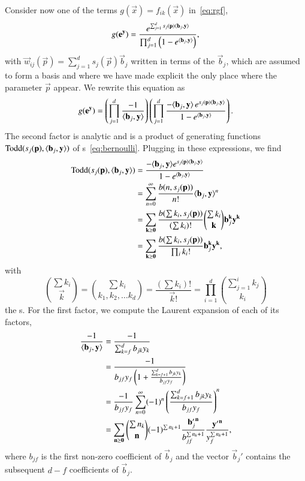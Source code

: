 Consider now one of the terms $g(\vec x) = f_{ik}(\vec x)$ in~\eqref{eq:rgf},
$$
g(\vec e^{\vec y}) =
	\frac{e^{\sum_{j=1}^d s_j(\vec p) \sp{b_j}y}}
	     {\prod_{j=1}^{d}\left(1-e^{\sp{b_j}y}\right)}
,
$$
with $\vec w_{ij}(\vec p) = \sum_{j=1}^d s_j(\vec p) \vec b_j$ written
in terms of the $\vec b_j$, which are assumed to form a basis
and where we have made explicit the only place where the
parameter $\vec p$ appear.
We rewrite this equation as
\begin{equation}
\label{eq:laurent}
g(\vec e^{\vec y}) =
	\left(\prod_{j=1}^d \frac{-1}{\sp{b_j}y}\right)
	\left(\prod_{j=1}^d \frac{-\sp{b_j}y \, e^{s_j(\vec p)\sp{b_j}y}}
				 {1-e^{\sp{b_j}y}} \right)
.
\end{equation}
The second factor is analytic and is a product of
generating functions
$\Todd(s_j(\vec p), \sp{b_j}y)$
of s~\eqref{eq:bernoulli}.
Plugging in these expressions, we find
\begin{align}
\Todd(s_j(\vec p), \sp{b_j}y)
&= \frac{-\sp{b_j}y e^{s_j(\vec p)\sp{b_j}y}}
				 {1-e^{\sp{b_j}y}}
\nonumber
\\
&= \sum_{n=0}^\infty \frac{b(n,s_j(\vec p))}{n!} \sp{b_j}y^n
\nonumber
\\
&= \sum_{\vec k \ge \vec 0}
	\frac{b(\sum k_i,s_j(\vec p))}{(\sum k_i)!}
		{\sum k_i \choose \vec k} \vec b_j^{\vec k} \vec y^{\vec k}
\nonumber
\\
&= \sum_{\vec k \ge \vec 0}
	\frac{b(\sum k_i,s_j(\vec p))}{\prod_i k_i!}
		 \vec b_j^{\vec k} \vec y^{\vec k}
\label{eq:laurent:todd}
,
\end{align}
with
$$
{\sum k_i \choose \vec k} =
{\sum k_i \choose k_1, k_2, \ldots k_d} =
\frac{(\sum k_i)!}{\vec k!} =
\prod_{i=1}^d {\sum_{j=1}^i k_j \choose k_i}
$$
the s.
For the first factor, we compute the Laurent expansion
of each of its factors,
\begin{align}
\frac{-1}{\sp{b_j}y}
&= \frac{-1}{\sum_{k=f}^d b_{jk} y_k}
\nonumber
\\
&= \frac{-1}{b_{jf} y_f\left(1 + \frac{\sum_{k=f+1}^d b_{jk} y_k}
					{b_{jf} y_f}\right)}
\nonumber
\\
&= \frac{-1}{b_{jf} y_f}
	\sum_{n=0}^\infty (-1)^n \left(\frac{\sum_{k=f+1}^d b_{jk} y_k}
					{b_{jf} y_f}\right)^n
\nonumber
\\
&= \sum_{\vec n \ge \vec 0}
	{\sum n_k \choose \vec n}
		(-1)^{\sum n_k+1}
		    \frac{{\vec b'_j}^{\vec n}}{b_{jf}^{\sum n_k+1}}
		    \frac{{\vec y'}^{\vec n}}{y_f^{\sum n_k+1}}
\label{eq:laurent:reciprocal}
,
\end{align}
where $b_{jf}$ is the first non-zero coefficient of $\vec b_j$
and the vector $\vec b_j'$ contains
the subsequent $d-f$ coefficients of $\vec b_j$.

